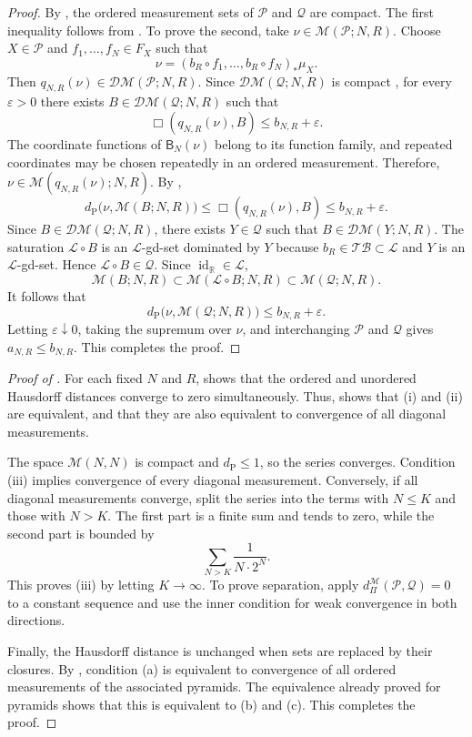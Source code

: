 \documentclass{amsart}
\theoremstyle{plain}
\theoremstyle{definition}
\theoremstyle{remark}
\newcommand{\R}{\mathbb{R}}
\newcommand{\M}{\mathcal{M}}
\newcommand{\DM}{\mathcal{DM}}
\renewcommand{\L}{\mathcal{L}}
\newcommand{\TB}{\mathcal{TB}}
\newcommand{\dpr}{d_{\operatorname{P}}}
\begin{document}
\begin{proof}
By , the ordered measurement sets of $\mathcal P$ and $\mathcal Q$ are compact. The first inequality follows from . To prove the second, take $\nu\in\M(\mathcal P;N,R)$. Choose $X\in\mathcal P$ and $f_1,\ldots,f_N\in F_X$ such that
\[\nu=(b_R\circ f_1,\ldots,b_R\circ f_N)_*\mu_X.\]
Then $q_{N,R}(\nu)\in\DM(\mathcal P;N,R)$. Since $\DM(\mathcal Q;N,R)$ is compact \cite[Lemma~7.1]{gds2}, for every $\varepsilon>0$ there exists $B\in\DM(\mathcal Q;N,R)$ such that
\[\Box(q_{N,R}(\nu),B)\leq b_{N,R}+\varepsilon.\]
The coordinate functions of $\mathsf B_N(\nu)$ belong to its function family, and repeated coordinates may be chosen repeatedly in an ordered measurement. Therefore, $\nu\in\M(q_{N,R}(\nu);N,R)$. By ,
\[
\dpr\bigl(\nu,\M(B;N,R)\bigr)
\leq\Box(q_{N,R}(\nu),B)\leq b_{N,R}+\varepsilon.
\]
Since $B\in\DM(\mathcal Q;N,R)$, there exists $Y\in\mathcal Q$ such that $B\in\DM(Y;N,R)$. The saturation $\L\circ B$ is an $\L$-gd-set dominated by $Y$ because $b_R\in\TB\subset\L$ and $Y$ is an $\L$-gd-set. Hence $\L\circ B\in\mathcal Q$. Since $\operatorname{id}_{\R}\in\L$,
\[
\M(B;N,R)\subset\M(\L\circ B;N,R)
\subset\M(\mathcal Q;N,R).
\]
It follows that
\[
\dpr\bigl(\nu,\M(\mathcal Q;N,R)\bigr)
\leq b_{N,R}+\varepsilon.
\]
Letting $\varepsilon\downarrow0$, taking the supremum over $\nu$, and interchanging $\mathcal P$ and $\mathcal Q$ gives $a_{N,R}\leq b_{N,R}$. This completes the proof.
\end{proof}

\begin{proof}[Proof of ]
For each fixed $N$ and $R$,  shows that the ordered and unordered Hausdorff distances converge to zero simultaneously. Thus,  shows that \textup{(i)} and \textup{(ii)} are equivalent, and that they are also equivalent to convergence of all diagonal measurements.

The space $\M(N,N)$ is compact \cite[Lemma~1.17(3) and Definition~5.37]{shioya2016mmg} and $\dpr\leq1$, so the series converges. Condition \textup{(iii)} implies convergence of every diagonal measurement. Conversely, if all diagonal measurements converge, split the series into the terms with $N\leq K$ and those with $N>K$. The first part is a finite sum and tends to zero, while the second part is bounded by
\[\sum_{N>K}\frac{1}{N\cdot2^N}.\]
This proves \textup{(iii)} by letting $K\to\infty$. To prove separation, apply $d_{\Pi}^{\M}(\mathcal P,\mathcal Q)=0$ to a constant sequence and use the inner condition for weak convergence in both directions.

Finally, the Hausdorff distance is unchanged when sets are replaced by their closures. By , condition \textup{(a)} is equivalent to convergence of all ordered measurements of the associated pyramids. The equivalence already proved for pyramids shows that this is equivalent to \textup{(b)} and \textup{(c)}.
This completes the proof.
\end{proof}
\end{document}
